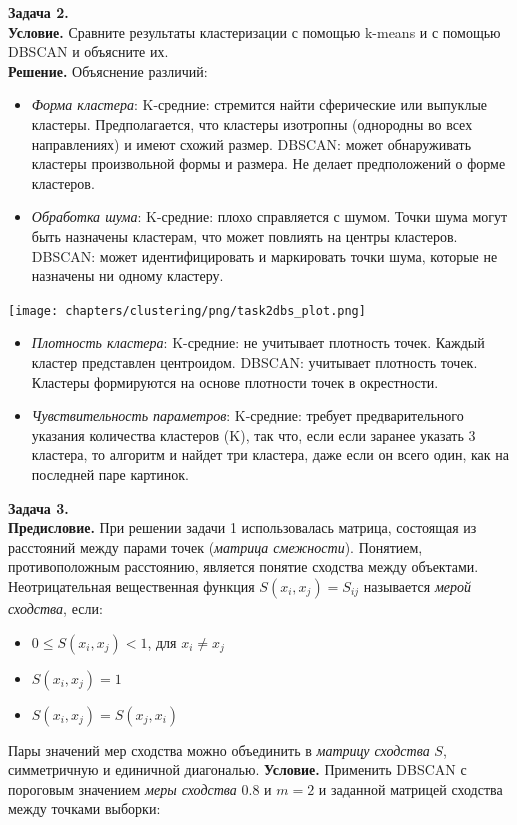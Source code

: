 \begin{minipage}{.5\textwidth}
\textbf{Задача 2.}\\
\textbf{Условие.}
  Сравните результаты кластеризации с помощью k-means и с помощью DBSCAN и объясните их.\\
\textbf{Решение.}
Объяснение различий:
\begin{itemize}
\item \textit{Форма кластера}:
K-средние: стремится найти сферические или выпуклые кластеры. Предполагается, что кластеры изотропны (однородны во всех направлениях) и имеют схожий размер.
DBSCAN: может обнаруживать кластеры произвольной формы и размера. Не делает предположений о форме кластеров.
\item \textit{Обработка шума}:
K-средние: плохо справляется с шумом. Точки шума могут быть назначены кластерам, что может повлиять на центры кластеров.
DBSCAN: может идентифицировать и маркировать точки шума, которые не назначены ни одному кластеру.
\end{itemize}
\end{minipage}%
\begin{minipage}{.4\textwidth}
      \texttt{[image: chapters/clustering/png/task2dbs\_plot.png]}
\end{minipage}
\begin{itemize}
\item \textit{Плотность кластера}:
K-средние: не учитывает плотность точек. Каждый кластер представлен центроидом.
DBSCAN: учитывает плотность точек. Кластеры формируются на основе плотности точек в окрестности.
\item \textit{Чувствительность параметров}:
K-средние: требует предварительного указания количества кластеров (K), так что, если если заранее указать 3 кластера, то алгоритм и найдет три кластера, даже если он всего один, как на последней паре картинок.
\end{itemize}

\textbf{Задача 3.}\\
\textbf{Предисловие.}
При решении задачи 1 использовалась матрица, состоящая из расстояний между парами точек (\textit{матрица смежности}). Понятием, противоположным расстоянию, является понятие сходства между объектами. Неотрицательная вещественная функция $S(x_i,x_j) = S_{ij}$ называется \textit{мерой сходства}, если:
\begin{itemize}
    \item $0 \leq S(x_i,x_j) < 1$, для $x_i \neq x_j$
    \item $S(x_i,x_j)=1$
    \item $S(x_i,x_j)=S(x_j,x_i)$
\end{itemize}
Пары значений мер сходства можно объединить в \textit{матрицу сходства} $S$, симметричную и единичной диагональю.
\textbf{Условие.}
Применить DBSCAN с пороговым значением \textit{меры сходства} 0.8 и $m = 2$ и заданной матрицей сходства между точками выборки:


